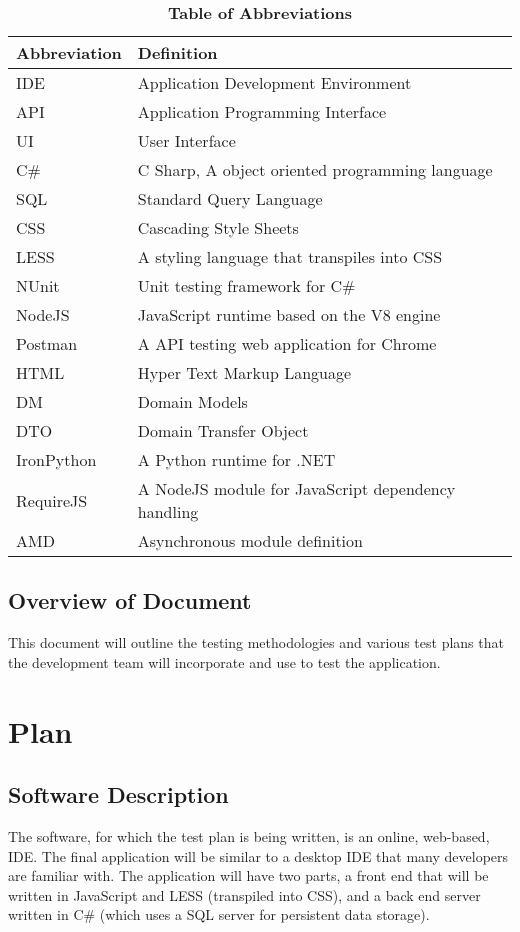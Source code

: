 \documentclass[12pt, titlepage]{article}
\begin{document}
\begin{table}[hbp]
\caption{\textbf{Table of Abbreviations}} \label{Table}

\begin{tabularx}{\textwidth}{p{3cm}X}
\toprule
\textbf{Abbreviation} & \textbf{Definition} \\
\midrule
  IDE & Application Development Environment\\
  API & Application Programming Interface\\
  UI & User Interface\\
  C\# & C Sharp, A object oriented programming language\\
  SQL & Standard Query Language\\
  CSS & Cascading Style Sheets\\
  LESS & A styling language that transpiles into CSS\\
  NUnit & Unit testing framework for C\#\\
  NodeJS & JavaScript runtime based on the V8 engine\\
  Postman & A API testing web application for Chrome\\
  HTML & Hyper Text Markup Language\\
  DM & Domain Models\\
  DTO & Domain Transfer Object\\
  IronPython & A Python runtime for .NET\\
  RequireJS & A NodeJS module for JavaScript dependency handling\\
  AMD & Asynchronous module definition\\
\bottomrule
\end{tabularx}

\end{table}

\subsection{Overview of Document}
This document will outline the testing methodologies and various test plans
that the development team will incorporate and use to test the application.

\section{Plan}
	
\subsection{Software Description}
The software, for which the test plan is being written, is an online, web-based,
IDE. The final application will be similar to a
desktop IDE that many developers are familiar with. The application will have
two parts, a front end that will be written in JavaScript and LESS (transpiled
into CSS), and a back end server written in C\# (which uses a SQL server for
persistent data storage).
\end{document}
